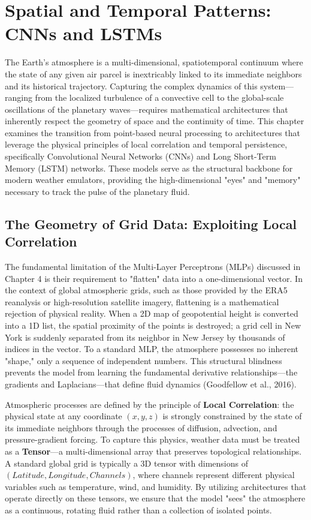 \chapter{Spatial and Temporal Patterns: CNNs and LSTMs}

The Earth’s atmosphere is a multi-dimensional, spatiotemporal continuum where the state of any given air parcel is inextricably linked to its immediate neighbors and its historical trajectory. Capturing the complex dynamics of this system—ranging from the localized turbulence of a convective cell to the global-scale oscillations of the planetary waves—requires mathematical architectures that inherently respect the geometry of space and the continuity of time. This chapter examines the transition from point-based neural processing to architectures that leverage the physical principles of local correlation and temporal persistence, specifically Convolutional Neural Networks (CNNs) and Long Short-Term Memory (LSTM) networks. These models serve as the structural backbone for modern weather emulators, providing the high-dimensional "eyes" and "memory" necessary to track the pulse of the planetary fluid.

\section{The Geometry of Grid Data: Exploiting Local Correlation}

The fundamental limitation of the Multi-Layer Perceptrons (MLPs) discussed in Chapter 4 is their requirement to "flatten" data into a one-dimensional vector. In the context of global atmospheric grids, such as those provided by the ERA5 reanalysis or high-resolution satellite imagery, flattening is a mathematical rejection of physical reality. When a 2D map of geopotential height is converted into a 1D list, the spatial proximity of the points is destroyed; a grid cell in New York is suddenly separated from its neighbor in New Jersey by thousands of indices in the vector. To a standard MLP, the atmosphere possesses no inherent "shape," only a sequence of independent numbers. This structural blindness prevents the model from learning the fundamental derivative relationships—the gradients and Laplacians—that define fluid dynamics (Goodfellow et al., 2016).

Atmospheric processes are defined by the principle of \textbf{Local Correlation}: the physical state at any coordinate $(x, y, z)$ is strongly constrained by the state of its immediate neighbors through the processes of diffusion, advection, and pressure-gradient forcing. To capture this physics, weather data must be treated as a \textbf{Tensor}—a multi-dimensional array that preserves topological relationships. A standard global grid is typically a 3D tensor with dimensions of $(Latitude, Longitude, Channels)$, where channels represent different physical variables such as temperature, wind, and humidity. By utilizing architectures that operate directly on these tensors, we ensure that the model "sees" the atmosphere as a continuous, rotating fluid rather than a collection of isolated points. 

